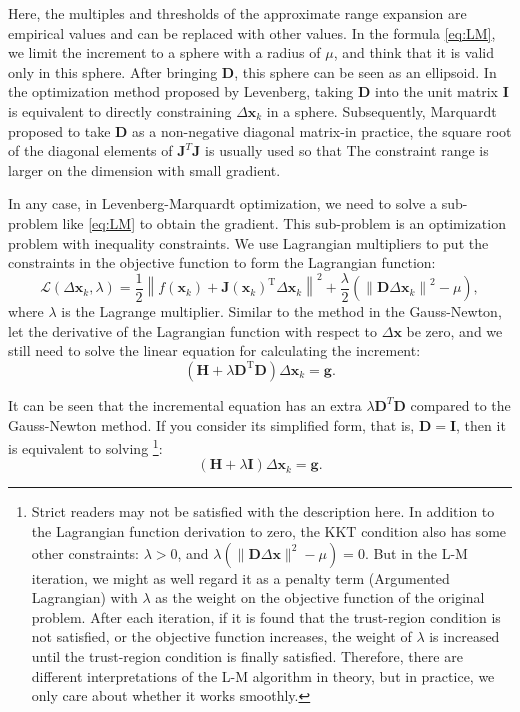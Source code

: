 Here, the multiples and thresholds of the approximate range expansion are empirical values and can be replaced with other values. In the formula \eqref{eq:LM}, we limit the increment to a sphere with a radius of $\mu$, and think that it is valid only in this sphere. After bringing $\mathbf{D}$, this sphere can be seen as an ellipsoid. In the optimization method proposed by Levenberg, taking $\mathbf{D}$ into the unit matrix $\mathbf{I}$ is equivalent to directly constraining $\Delta \mathbf{x}_k$ in a sphere. Subsequently, Marquardt proposed to take $\mathbf{D}$ as a non-negative diagonal matrix-in practice, the square root of the diagonal elements of $\mathbf{J}^T \mathbf{J}$ is usually used so that The constraint range is larger on the dimension with small gradient.

In any case, in Levenberg-Marquardt optimization, we need to solve a sub-problem like \eqref{eq:LM} to obtain the gradient. This sub-problem is an optimization problem with inequality constraints. We use Lagrangian multipliers to put the constraints in the objective function to form the Lagrangian function:
\begin{equation}
    \mathcal{L}(\Delta \mathbf{x}_k, \lambda)= \frac{1}{2} {\left\| {f\left( \mathbf{x}_k \right) + \mathbf{J} \left( \mathbf{x}_k \right)^\mathrm{T} \Delta \mathbf{x}_k} \right\|^2} + \frac{\lambda}{2} \left( \left\| \mathbf{D} \Delta \mathbf{x}_k \right\|^2 - \mu \right),
\end{equation}
where $\lambda$ is the Lagrange multiplier. Similar to the method in the Gauss-Newton, let the derivative of the Lagrangian function with respect to $\Delta \mathbf{x}$ be zero, and we still need to solve the linear equation for calculating the increment:
\begin{equation}
    \left( \mathbf{H} +\lambda \mathbf{D}^\mathrm{T} \mathbf{D} \right) \Delta \mathbf{x}_k = \mathbf{g}.
\end{equation}

It can be seen that the incremental equation has an extra $\lambda \mathbf{D}^T \mathbf{D}$ compared to the Gauss-Newton method. If you consider its simplified form, that is, $\mathbf{D}=\mathbf{I}$, then it is equivalent to solving \footnote{Strict readers may not be satisfied with the description here. In addition to the Lagrangian function derivation to zero, the KKT condition also has some other constraints: $\lambda>0$, and $\lambda(\|\mathbf{D} \Delta \mathbf{x}\|^2-\mu)=0$. But in the L-M iteration, we might as well regard it as a penalty term (Argumented Lagrangian) with $\lambda$ as the weight on the objective function of the original problem. After each iteration, if it is found that the trust-region condition is not satisfied, or the objective function increases, the weight of $\lambda$ is increased until the trust-region condition is finally satisfied. Therefore, there are different interpretations of the L-M algorithm in theory, but in practice, we only care about whether it works smoothly. }:
\begin{displaymath}
    \left( \mathbf{H} +\lambda \mathbf{I} \right) \Delta \mathbf{x}_k = \mathbf{g}.
\end{displaymath}

